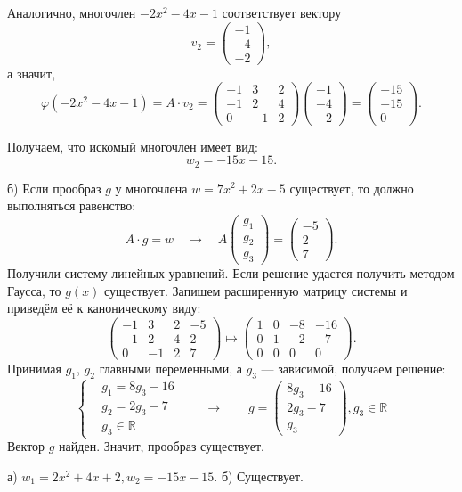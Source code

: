 \documentclass[a4paper,12pt]{article}
\newcommand{\aanswer}{\par\vspace{5pt}\noindent{\bf Ответ. }}
\begin{document}
Аналогично, многочлен $-2x^2 - 4x - 1$ соответствует вектору 
$$v_2=
\begin{pmatrix}
-1 \\ -4 \\ -2
\end{pmatrix}
,$$
а значит, 		
$$\varphi(-2x^2 - 4x - 1)=A \cdot v_2 =
\begin{pmatrix}
-1&3&2\\
-1&2&4\\
0&-1&2
\end{pmatrix}
\begin{pmatrix}
-1 \\ -4 \\ -2
\end{pmatrix}
=
\begin{pmatrix}
-15 \\ -15 \\ 0
\end{pmatrix}.
$$ \par
Получаем, что искомый многочлен имеет вид:
$$w_2 = -15x-15.$$
\vspace{1pt} \par
б) Если прообраз $g$ у многочлена $w = 7x^2 + 2x - 5$ существует, то должно выполняться равенство:
$$A \cdot g = w 
\quad \longrightarrow \quad
A 
\begin{pmatrix}
g_1 \\ g_2 \\ g_3
\end{pmatrix}
 = 
\begin{pmatrix}
-5 \\ 2 \\ 7
\end{pmatrix}.$$
Получили систему линейных уравнений. Если решение удастся получить методом Гаусса, то $g(x)$ существует. Запишем расширенную матрицу системы и приведём её к каноническому виду:
$$ \left(\begin{array}{ccc|c}
-1&3&2&-5\\
-1&2&4&2\\
0&-1&2&7
\end{array} \right)
\longmapsto
\left(\begin{array}{ccc|c}
1&0&-8&-16\\
0&1&-2&-7\\
0&0&0&0
\end{array} \right).
$$
Принимая $g_1$, $g_2$ главными переменными, а $g_3$ --- зависимой, получаем решение:
$$
\left\{
\begin{aligned}
&g_1 = 8g_3-16\\
&g_2 = 2g_3-7 \\
&g_3 \in \mathbb{R}
\end{aligned}
\right.
\qquad \longrightarrow \qquad
g =
\begin{pmatrix}
8g_3-16 \\ 2g_3-7 \\ g_3
\end{pmatrix}, 
g_3 \in \mathbb{R}
$$ 
Вектор $g$ найден. Значит, прообраз существует.
\aanswer
а) $w_1 = 2x^2+4x+2, w_2 = -15x-15$. б) Существует.
\end{document}
